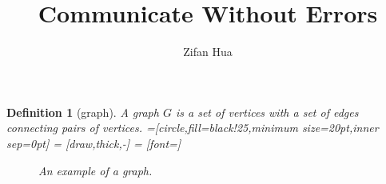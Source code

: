 \documentclass{article}
\title{Communicate Without Errors}
\author{Zifan Hua}
\newtheorem{definition}{Definition}[section]
\begin{document}
      \maketitle

      \begin{definition}[graph] \label{def:graph}
            A graph $ G $ is a set of vertices with a set of edges connecting pairs of vertices.
            =[circle,fill=black!25,minimum size=20pt,inner sep=0pt]
             = [draw,thick,-]
             = [font=\small]
            \begin{figure}[h!]
                    \label{fig:graphDefinitionExample}
                    \caption{An example of a graph.}
            \end{figure}
      \end{definition}
\end{document}
